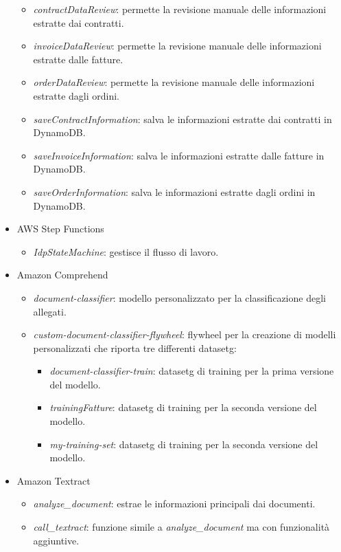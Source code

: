 \begin{itemize}
\begin{itemize}
        \item \emph{contractDataReview}: permette la revisione manuale delle informazioni estratte dai contratti.
        \item \emph{invoiceDataReview}: permette la revisione manuale delle informazioni estratte dalle fatture.
        \item \emph{orderDataReview}: permette la revisione manuale delle informazioni estratte dagli ordini.
        \item \emph{saveContractInformation}: salva le informazioni estratte dai contratti in DynamoDB.
        \item \emph{saveInvoiceInformation}: salva le informazioni estratte dalle fatture in DynamoDB.
        \item \emph{saveOrderInformation}: salva le informazioni estratte dagli ordini in DynamoDB.
    \end{itemize}
    \item AWS Step Functions
    \begin{itemize}
        \item \emph{IdpStateMachine}: gestisce il flusso di lavoro.
    \end{itemize}
    \item Amazon Comprehend
    \begin{itemize}
        \item \emph{document-classifier}: modello personalizzato per la classificazione degli allegati.
        \item \emph{custom-document-classifier-flywheel}: flywheel per la creazione di modelli personalizzati che riporta tre differenti \gls{datasetg}:
        \begin{itemize}
            \item \emph{document-classifier-train}: \gls{datasetg} di training per la prima versione del modello.
            \item \emph{trainingFatture}: \gls{datasetg} di training per la seconda versione del modello.
            \item \emph{my-training-set}: \gls{datasetg} di training per la seconda versione del modello.
        \end{itemize}
    \end{itemize}
    \item Amazon Textract
    \begin{itemize}
        \item \emph{analyze\_document}: estrae le informazioni principali dai documenti.
        \item \emph{call\_textract}: funzione simile a \emph{analyze\_document} ma con funzionalità aggiuntive.

\end{itemize}
\end{itemize}
